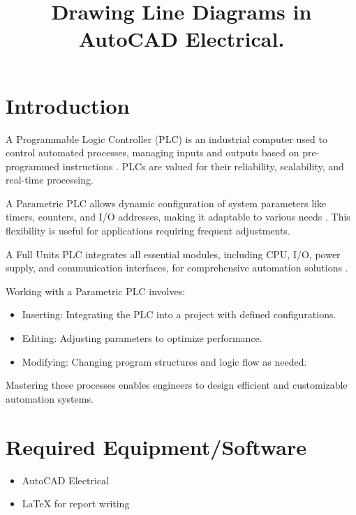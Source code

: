 \documentclass[12pt]{article}
\title{Drawing Line Diagrams in AutoCAD Electrical.}
\author{}
\date{}
\begin{document}


\pagebreak

\tableofcontents

\pagebreak
{}
\maketitle

\section*{Introduction}
A Programmable Logic Controller (PLC) is an industrial computer used to control automated processes, managing inputs and outputs based on pre-programmed instructions \cite{johnson2006introduction}. PLCs are valued for their reliability, scalability, and real-time processing.

A Parametric PLC allows dynamic configuration of system parameters like timers, counters, and I/O addresses, making it adaptable to various needs \cite{clarke2005practical}. This flexibility is useful for applications requiring frequent adjustments.

A Full Units PLC integrates all essential modules, including CPU, I/O, power supply, and communication interfaces, for comprehensive automation solutions \cite{bolton2015programmable}.

Working with a Parametric PLC involves:
\begin{itemize}
    \item Inserting: Integrating the PLC into a project with defined configurations.
    \item Editing: Adjusting parameters to optimize performance.
    \item Modifying: Changing program structures and logic flow as needed.
\end{itemize}

Mastering these processes enables engineers to design efficient and customizable automation systems.

\section*{Required Equipment/Software}
\begin{itemize}
    \item AutoCAD Electrical
    \item \LaTeX{} for report writing
\end{itemize}
\end{document}
